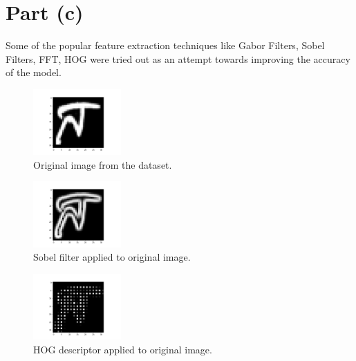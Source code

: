 \documentclass[a4paper]{article}
\begin{document}
\section*{Part (c)}
Some of the popular feature extraction techniques like Gabor Filters, Sobel Filters, FFT, HOG were tried out as an attempt towards improving the accuracy of the model.

\begin{figure}[h!]
\centering
\includegraphics[width=0.3\textwidth]{orig-main.png}
\caption{\label{fig:orig}Original image from the dataset.}
\end{figure}

\begin{figure}[h!]
\centering
\includegraphics[width=0.3\textwidth]{sobel-main.png}
\caption{\label{fig:sobel}Sobel filter applied to original image.}
\end{figure}

\newpage
\begin{figure} [h!]
\centering
\includegraphics[width=0.3\textwidth]{hog-main.png}
\caption{\label{fig:hog}HOG descriptor applied to original image.}
\end{figure}
\end{document}
